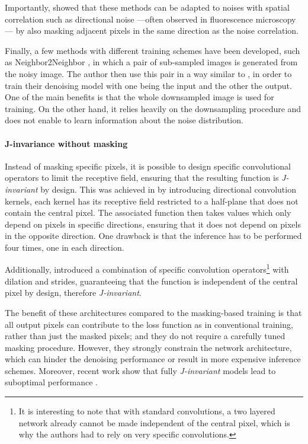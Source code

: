 \documentclass[lettersize,journal]{IEEEtran}
\begin{document}
Importantly, \cite{broaddus2020removing} showed that these methods can be adapted to noises with spatial correlation such as directional noise ---often observed in fluorescence microscopy--- by also masking adjacent pixels in the same direction as the noise correlation.

Finally, a few methods with different training schemes have been developed, such as Neighbor2Neighbor \cite{huang2021neighbor2neighbor}, in which a pair of sub-sampled images is generated from the noisy image. The author then use this pair in a way similar to \cite{lehtinen2018noise2noise}, in order to train their denoising model with one being the input and the other the output. One of the main benefits is that the whole downsampled image is used for training. On the other hand, it relies heavily on the downsampling procedure and does not enable to learn information about the noise distribution.

\paragraph{J-invariance without masking}
Instead of masking specific pixels, it is possible to design specific convolutional operators to limit the receptive field, ensuring that the resulting function is \textit{J-invariant} by design. This was achieved in \cite{laine2019high} by introducing directional convolution kernels, each kernel has its receptive field restricted to a half-plane that does not contain the central pixel. The associated function then takes values which only depend on pixels in specific directions, ensuring that it does not depend on pixels in the opposite direction. One drawback is that the inference has to be performed four times, one in each direction.

Additionally, \cite{cha2019fully, lee2020noise2kernel} introduced a combination of specific convolution operators\footnote{It is interesting to note that with standard convolutions, a two layered network already cannot be made independent of the central pixel, which is why the authors had to rely on very specific convolutions.} with dilation and strides, guaranteeing that the function is independent of the central pixel by design, therefore \textit{J-invariant}.

The benefit of these architectures compared to the masking-based training is that all output pixels can contribute to the loss function as in conventional training, rather than just the masked pixels; and they do not require a carefully tuned masking procedure. However, they strongly constrain the network architecture, which can hinder the denoising performance or result in more expensive inference schemes. Moreover, recent work show that fully \textit{J-invariant} models lead to suboptimal performance \cite{xie2020noise2same}.
\end{document}

